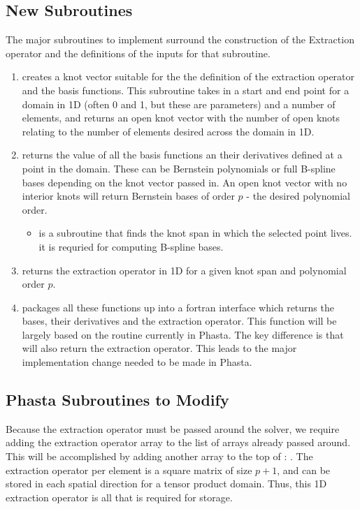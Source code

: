 \documentclass[./]{subfiles}
\begin{document}
\subsection{New Subroutines}
The major subroutines to implement surround the construction of the Extraction operator and the definitions of the inputs for that subroutine.
\begin{enumerate}
\item {} creates a knot vector suitable for the the definition of the extraction operator and the basis functions. This subroutine takes in a start and end point for a domain in 1D (often 0 and 1, but these are parameters) and a number of elements, and returns an open knot vector with the number of open knots relating to the number of elements desired across the domain in 1D. 
\item {} returns the value of all the basis functions an their derivatives defined at a point in the domain. These can be Bernstein polynomials or full B-spline bases depending on the knot vector passed in. An open knot vector with no interior knots will return Bernstein bases of order $p$ - the desired polynomial order. 
\begin{itemize}
	\item {} is a subroutine that finds the knot span in which the selected point lives. it is requried for computing B-spline bases.
\end{itemize}
\item {} returns the extraction operator in 1D for a given knot span and polynomial order $p$. 
\item {} packages all these functions up into a fortran interface which returns the bases, their derivatives and the extraction operator. This function will be largely based on the  routine currently in Phasta. The key difference is that  will also return the extraction operator. This leads to the major implementation change needed to be made in Phasta.
\end{enumerate}

\subsection{Phasta Subroutines to Modify}
Because the extraction operator must be passed around the solver, we require adding the extraction operator array to the list of arrays already passed around. This will be accomplished by adding another array to the top of : . The extraction operator per element is a square matrix of size $p+1$, and can be stored in each spatial direction for a tensor product domain. Thus, this 1D extraction operator is all that is required for storage. 
\end{document}
